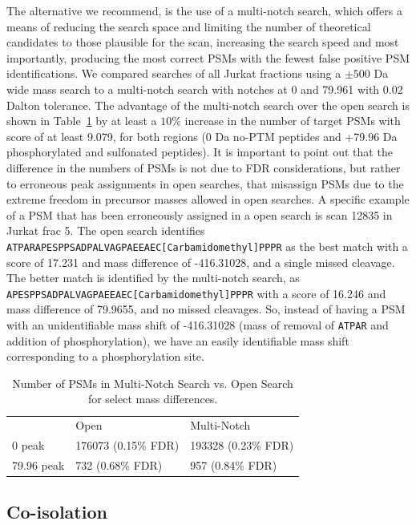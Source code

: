 \documentclass[journal=jprobs,manuscript=article]{achemso}
\begin{document}
The alternative we recommend, is the use of a multi-notch search, which offers a means of reducing the search space and limiting the number of theoretical candidates to those plausible for the scan, increasing the search speed and most importantly, producing the most correct PSMs with the fewest false positive PSM identifications.
We compared searches of all Jurkat fractions using a $\pm 500$ Da wide mass search to a multi-notch search with notches at 0 and 79.961 with 0.02 Dalton tolerance.
The advantage of the multi-notch search over the open search is shown in Table~\ref{tbl:multiVsWide} by at least a $10\%$ increase in the number of target PSMs with score of at least 9.079, for both regions (0 Da no-PTM peptides and +79.96 Da phosphorylated and sulfonated peptides).
It is important to point out that the difference in the numbers of PSMs is not due to FDR considerations, but rather to erroneous peak assignments in open searches, that misassign PSMs due to the extreme freedom in precursor masses allowed in open searches.
A specific example of a PSM that has been erroneously assigned in a open search is scan 12835 in Jurkat frac 5.
The open search identifies \texttt{ATPARAPESPPSADPALVAGPAEEAEC[Carbamidomethyl]PPPR} as the best match with a score of 17.231 and mass difference of -416.31028, and a single missed cleavage.
The better match is identified by the multi-notch search, as \texttt{APESPPSADPALVAGPAEEAEC[Carbamidomethyl]PPPR} with a score of 16.246 and mass difference of 79.9655, and no missed cleavages.
So, instead of having a PSM with an unidentifiable mass shift of -416.31028 (mass of removal of \texttt{ATPAR} and addition of phosphorylation), we have an easily identifiable mass shift corresponding to a phosphorylation site.

\begin{table}[]
\centering
\caption{Number of PSMs in Multi-Notch Search vs. Open Search for select mass differences.}
\label{tbl:multiVsWide}
\begin{tabular}{lll}
               & Open                     & Multi-Notch         \\
0 peak         & 176073  (0.15\% FDR)     & 193328 (0.23\% FDR) \\
79.96 peak     & 732   (0.68\% FDR)       & 957  (0.84\% FDR)   \\
\end{tabular}
\end{table}

\subsection{Co-isolation}
\end{document}
